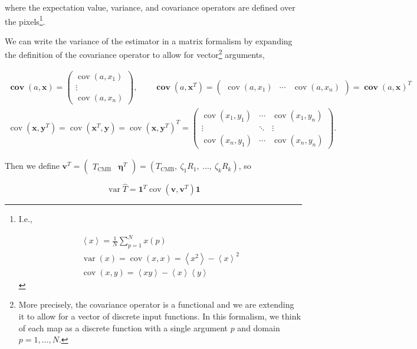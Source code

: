 \documentclass[twoside,10pt]{article}
\DeclareMathOperator{\vvar}{var}
\DeclareMathOperator{\cvar}{cov}
\DeclareMathOperator{\bcvar}{\mathbf{cov}}
\newcommand{\ve}[1]{\mathbf{#1}}
\newcommand{\Avg}[1]{\left< #1 \right>}
\newcommand{\Tcmb}[0]{T_\mathrm{CMB}}
\newcommand{\var}[1]{\vvar{\left(#1\right)}}
\newcommand{\cov}[1]{\cvar{\left(#1\right)}}
\newcommand{\bcov}[1]{\bcvar{\left(#1\right)}}
\newcommand{\bone}[0]{\mathbf{1}}
\newcommand{\varhT}[0]{\vvar{\hat{T}}}
\begin{document}
where the expectation value, variance, and covariance operators are defined
over the pixels\footnote{I.e.,

\begin{gather*}
    \Avg{x} = \frac{1}{N} \sum_{p=1}^N x(p) \\
    \var{x} = \cov{x, x} = \Avg{x^2} - \Avg{x}^2 \\
    \cov{x, y} = \Avg{xy} - \Avg{x}\Avg{y}
\end{gather*}
}.

We can write the variance of the estimator in a matrix formalism by expanding
the definition of the covariance operator to allow for vector\footnote{More
precisely, the covariance operator is a functional and we are extending it to
allow for a vector of discrete input functions. In this formalism, we think of
each map as a discrete function with a single argument $p$ and domain
$p = 1, \dots, N$.} arguments,

\begin{gather*}
    \bcov{a, \ve{x}} =
        \begin{pmatrix}
            \cov{a, x_1} \\
            \vdots \\
            \cov{a, x_n}
        \end{pmatrix}, \qquad \bcov{a, \ve{x}^T} =
        \begin{pmatrix}
            \cov{a, x_1} & \cdots & \cov{a, x_n}
        \end{pmatrix} = \bcov{a, \ve{x}}^T \\
    \cov{\ve{x}, \ve{y}^T} = \cov{\ve{x}^T, \ve{y}} = \cov{\ve{x}, \ve{y}^T}^T =
        \begin{pmatrix}
            \cov{x_1, y_1} & \cdots & \cov{x_1, y_n} \\
            \vdots         & \ddots & \vdots         \\
            \cov{x_n, y_1} & \cdots & \cov{x_n, y_n}
        \end{pmatrix}.
\end{gather*}

Then we define $\ve{v}^T = \left(\begin{smallmatrix}\Tcmb & \bm{\eta}^T\end{smallmatrix}\right) = \left( \Tcmb,\ \zeta_1R_1,\ \dots,\ \zeta_kR_k \right)$,
so

\begin{equation}
    \varhT = \bone^T \cov{\ve{v}, \ve{v}^T} \bone
\end{equation}
\end{document}
